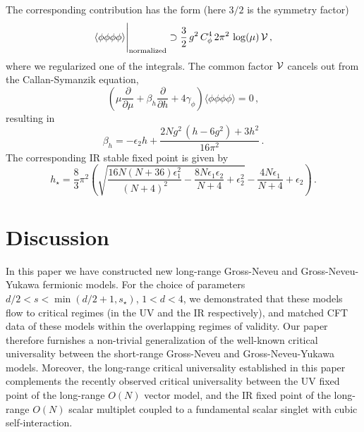 \documentclass[aps,amsmath,amssymb,prd,showpacs,floatfix,preprint,superscriptaddress,nofootinbib,12pt]{article}
\begin{document}
The corresponding contribution has the form  (here $3/2$ is the symmetry factor)
\begin{equation}
\langle\phi\phi\phi\phi\rangle\Bigg|_{\textrm{normalized}}\supset  \frac{3}{2}\,g^2\,C_\phi^4\,2\pi^2\,\log(\mu)\,{\cal V}\,,
\end{equation}
where we regularized one of the integrals.
The common factor ${\cal V}$ cancels out from the Callan-Symanzik equation,
\begin{equation}
\left( \mu\frac{\partial}{\partial\mu} + \beta_h\frac{\partial}{\partial h}
+4\gamma_\phi \right)\langle\phi\phi\phi\phi\rangle = 0\,,
\end{equation}
resulting in 
\begin{equation}
\beta_h = -\epsilon_2 h+\frac{2 N g^2\,( h - 6 g^2)  +3 h^2}{16 \pi ^2}\,.
\end{equation}
The corresponding IR stable fixed point is given by
\begin{equation}
h_\star = \frac{8}{3} \pi ^2 \left(\sqrt{\frac{16 N (N+36)
\epsilon_1^2}{(N+4)^2}-\frac{8 N \epsilon_1 \epsilon_2}{N+4}+\epsilon_2^2}
-\frac{4 N \epsilon_1}{N+4}+\epsilon_2\right)\,.
\end{equation}


\section{Discussion}
\label{sec:discussion}

In this paper we have constructed new long-range Gross-Neveu and Gross-Neveu-Yukawa
fermionic models. For the choice
of parameters $d/2<s<\min(d/2+1,s_\star)$, $1<d<4$,
we demonstrated that these
models flow to critical regimes (in the UV and the IR respectively), and matched CFT data of these models within
the overlapping regimes of validity. Our paper therefore furnishes a non-trivial
generalization of the well-known critical universality between the short-range
Gross-Neveu and Gross-Neveu-Yukawa models. Moreover, the long-range critical
universality established in this paper complements the recently
observed critical universality between the UV fixed point of the long-range $O(N)$
vector model, and the IR fixed point of the long-range $O(N)$ scalar multiplet coupled to
a fundamental scalar singlet with cubic self-interaction.
\end{document}
